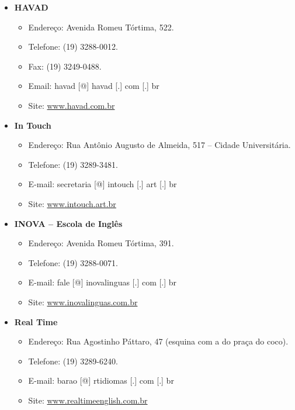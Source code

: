 \begin{itemize}
\item  \textbf{HAVAD}
\begin{itemize}
\item  Endereço: Avenida Romeu Tórtima, 522.
\item  Telefone: (19) 3288-0012.
\item  Fax: (19) 3249-0488.
\item  Email: havad [@] havad [.] com [.] br
\item  Site: \url{www.havad.com.br}
\end{itemize}
\end{itemize}

\begin{itemize}
\item  \textbf{In Touch}
\begin{itemize}
\item  Endereço: Rua Antônio Augusto de Almeida, 517 -- Cidade Universitária.
\item  Telefone: (19) 3289-3481.
\item  E-mail: secretaria [@] intouch [.] art [.] br
\item  Site: \url{www.intouch.art.br}
\end{itemize}
\end{itemize}

\begin{itemize}
\item  \textbf{INOVA -- Escola de Inglês}
\begin{itemize}
\item  Endereço: Avenida Romeu Tórtima, 391.
\item  Telefone: (19) 3288-0071.
\item  E-mail: fale [@] inovalinguas [.] com [.] br
\item  Site: \url{www.inovalinguas.com.br}
\end{itemize}
\end{itemize}

\begin{itemize}
\item  \textbf{Real Time}
\begin{itemize}
\item  Endereço: Rua Agostinho Páttaro, 47 (esquina com a do praça do coco).
\item  Telefone: (19) 3289-6240.
\item  E-mail: barao [@] rtidiomas [.] com [.] br
\item  Site: \url{www.realtimeenglish.com.br}
\end{itemize}
\end{itemize}

